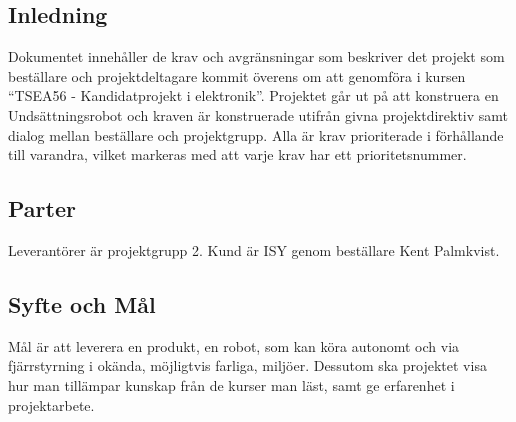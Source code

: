 \documentclass[11pt]{article}
\begin{document}
\pagebreak


\begin{flushleft}

\section{Inledning}

Dokumentet innehåller de krav och avgränsningar som beskriver det projekt som beställare och projektdeltagare kommit överens om att genomföra i kursen “TSEA56 - Kandidatprojekt i elektronik”. Projektet går ut på att konstruera en Undsättningsrobot och kraven är konstruerade utifrån givna projektdirektiv samt dialog mellan beställare och projektgrupp.
Alla är krav prioriterade i förhållande till varandra, vilket markeras med att varje krav har ett prioritetsnummer.

\subsection{Parter}
Leverantörer är projektgrupp 2. Kund är ISY genom beställare Kent Palmkvist.

\subsection{Syfte och Mål}
Mål är att leverera en produkt, en robot, som kan köra autonomt och via fjärrstyrning i okända, möjligtvis farliga, miljöer. Dessutom ska projektet visa hur man tillämpar kunskap från de kurser man läst, samt ge erfarenhet i projektarbete.

\pagebreak


\end{flushleft}
\end{document}
